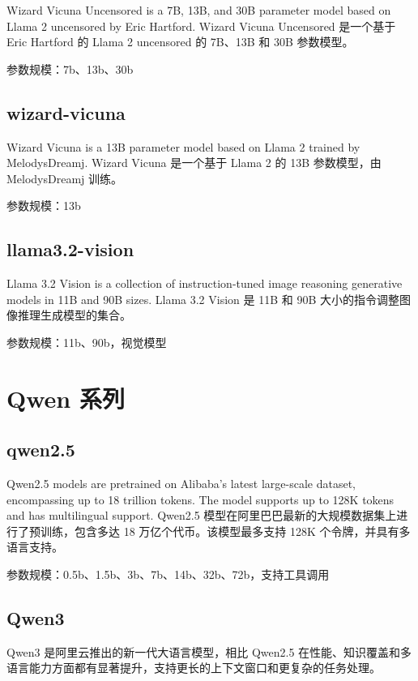 \documentclass[12pt,UTF8]{ctexbook}
\begin{document}
Wizard Vicuna Uncensored is a 7B, 13B, and 30B parameter model based on Llama 2 uncensored by Eric Hartford.
Wizard Vicuna Uncensored 是一个基于 Eric Hartford 的 Llama 2 uncensored 的 7B、13B 和 30B 参数模型。

参数规模：7b、13b、30b

\subsection{wizard-vicuna}

Wizard Vicuna is a 13B parameter model based on Llama 2 trained by MelodysDreamj.
Wizard Vicuna 是一个基于 Llama 2 的 13B 参数模型，由 MelodysDreamj 训练。

参数规模：13b

\subsection{llama3.2-vision}

Llama 3.2 Vision is a collection of instruction-tuned image reasoning generative models in 11B and 90B sizes.
Llama 3.2 Vision 是 11B 和 90B 大小的指令调整图像推理生成模型的集合。

参数规模：11b、90b，视觉模型

\section{Qwen 系列}

\subsection{qwen2.5}

Qwen2.5 models are pretrained on Alibaba's latest large-scale dataset, encompassing up to 18 trillion tokens. The model supports up to 128K tokens and has multilingual support.
Qwen2.5 模型在阿里巴巴最新的大规模数据集上进行了预训练，包含多达 18 万亿个代币。该模型最多支持 128K 个令牌，并具有多语言支持。

参数规模：0.5b、1.5b、3b、7b、14b、32b、72b，支持工具调用

\subsection{Qwen3}

Qwen3 是阿里云推出的新一代大语言模型，相比 Qwen2.5 在性能、知识覆盖和多语言能力方面都有显著提升，支持更长的上下文窗口和更复杂的任务处理。
\end{document}
